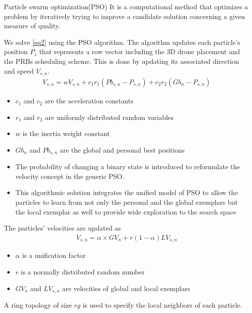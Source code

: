 \documentclass{beamer}
\begin{document}
\begin{frame}{}
\begin{block}{Particle swarm optimization(PSO)}
It is a computational method that optimizes a problem by iteratively trying to improve a candidate solution concerning a given measure of quality.
\end{block}
\begin{block}{}
We solve \eqref{eq2} using the PSO algorithm. The algorithm updates each particle’s position $P_s$ that represents a row vector including the 3D drone placement and the PRBs scheduling scheme. This is done by updating its associated direction and speed $V_{s,n}$.
\begin{align}
    V_{s,n}=w V_{s,n}+c_1r_1(Pb_{s,n}-P_{s,n})+c_2r_2(Gb_{n}-P_{s,n})
\end{align}
\end{block}
\begin{block}{}
\begin{itemize}
    \item $c_1$ and $c_2$ are the acceleration constants
    \item $r_1$ and $r_2$ are uniformly distributed random variables
    \item $w$ is the inertia weight constant
    \item $Gb_n$ and $Pb_{s,n}$ are the global and personal best positions
\end{itemize}
\end{block}
\end{frame}
\begin{frame}{}
    \begin{block}{}
    \begin{itemize}
        \item The probability of changing a binary state is introduced to reformulate the velocity concept in the generic PSO.
        \item This algorithmic solution integrates the unified model of PSO to allow the particles to learn from not only the personal and the global exemplars but the local exemplar as well to provide wide exploration to the search space
    \end{itemize}
    The particles’ velocities are updated as
    \begin{align}
        V_{s,n}=\alpha\times GV_n + r(1 - \alpha)LV_{s,n}
    \end{align}
    \end{block}
    \begin{block}{}
    \begin{itemize}
        \item $\alpha$ is a unification factor
        \item $r$ is a normally distributed random number
        \item $GV_n$ and $LV_{s,n}$ are velocities of global and local exemplars
    \end{itemize}
    \end{block}
    \begin{block}{}
        A ring topology of size $rg$ is used to specify the local neighbors of each particle.
    \end{block}
\end{frame}
\end{document}
